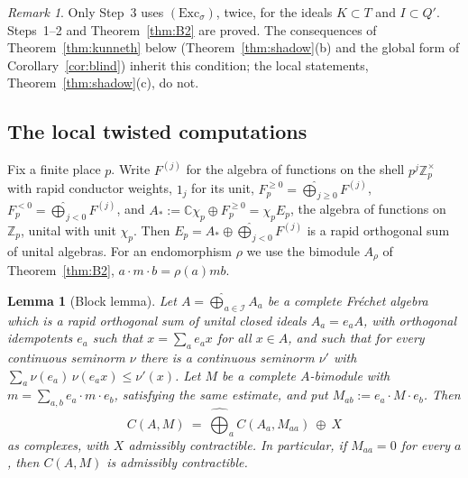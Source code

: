 \documentclass[11pt]{amsart}
\newtheorem{lemma}[theorem]{Lemma}
\theoremstyle{definition}
\theoremstyle{remark}
\newtheorem{remark}[theorem]{Remark}
\newcommand{\C}{\mathbb C}
\newcommand{\Z}{\mathbb Z}
\begin{document}
\begin{remark}\label{rem:kunnethstatus}
Only Step~3 uses $(\mathrm{Exc}_{\sigma})$, twice, for the ideals $K\subset T$
and $I\subset Q'$.  Steps~1--2 and Theorem~\ref{thm:B2} are proved.  The
consequences of Theorem~\ref{thm:kunneth} below (Theorem~\ref{thm:shadow}(b)
and the global form of Corollary~\ref{cor:blind}) inherit this condition; the
local statements, Theorem~\ref{thm:shadow}(c), do not.
\end{remark}

\subsection{The local twisted computations}

Fix a finite place $p$.  Write $F^{(j)}$ for the algebra of functions on the
shell $p^{j}\Z_p^{\times}$ with rapid conductor weights, $1_j$ for its unit,
$F_p^{\ge0}=\widehat\bigoplus_{j\ge0}F^{(j)}$, $F_p^{<0}=\widehat\bigoplus_{j<0}
F^{(j)}$, and $A_*:=\C\chi_p\oplus F_p^{\ge0}=\chi_pE_p$, the algebra of
functions on $\Z_p$, unital with unit $\chi_p$.  Then $E_p=A_*\oplus
\widehat\bigoplus_{j<0}F^{(j)}$ is a rapid orthogonal sum of unital algebras.
For an endomorphism $\rho$ we use the bimodule $A_{\rho}$ of
Theorem~\ref{thm:B2}, $a\cdot m\cdot b=\rho(a)mb$.

\begin{lemma}[Block lemma]\label{lem:block}
Let $A=\widehat\bigoplus_{a\in\mathcal I}A_a$ be a complete Fr\'echet algebra
which is a rapid orthogonal sum of unital closed ideals $A_a=e_aA$, with
orthogonal idempotents $e_a$ such that $x=\sum_ae_ax$ for all $x\in A$, and
such that for every continuous seminorm $\nu$ there is a continuous seminorm
$\nu'$ with $\sum_a\nu(e_a)\,\nu(e_ax)\le\nu'(x)$.  Let $M$ be a complete
$A$-bimodule with $m=\sum_{a,b}e_a\cdot m\cdot e_b$, satisfying the same
estimate, and put $M_{ab}:=e_a\cdot M\cdot e_b$.  Then
\[
C(A,M)\ =\ \widehat\bigoplus_{a}C(A_a,M_{aa})\ \oplus\ X
\]
as complexes, with $X$ admissibly contractible.  In particular, if
$M_{aa}=0$ for every $a$, then $C(A,M)$ is admissibly contractible.
\end{lemma}
\end{document}
